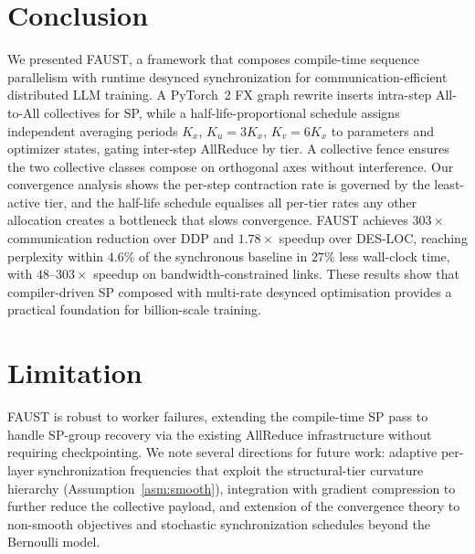 \documentclass{article}
\begin{document}
\section{Conclusion}
\label{sec:conclusion}
We presented FAUST, a framework that composes compile-time sequence parallelism
with runtime desynced synchronization for communication-efficient distributed
LLM training. A PyTorch~2 FX graph rewrite inserts intra-step All-to-All
collectives for SP, while a half-life-proportional schedule assigns independent
averaging periods $K_x$, $K_u{=}3K_x$, $K_v{=}6K_x$ to parameters and optimizer
states, gating inter-step AllReduce by tier. A collective fence ensures the two
collective classes compose on orthogonal axes without interference.
Our convergence analysis shows the per-step contraction rate is governed by the
least-active tier, and the half-life schedule equalises all per-tier rates any
other allocation creates a bottleneck that slows convergence.
FAUST achieves $303{\times}$ communication reduction over DDP and $1.78{\times}$
speedup over DES-LOC, reaching perplexity within $4.6\%$ of the synchronous
baseline in $27\%$ less wall-clock time, with $48$--$303{\times}$ speedup on
bandwidth-constrained links. These results show that compiler-driven SP composed
with multi-rate desynced optimisation provides a practical foundation for
billion-scale training.



\section{Limitation}
\label{sec:limitation}
FAUST is robust to worker failures, extending the compile-time SP pass to handle SP-group recovery via the existing AllReduce infrastructure without requiring checkpointing.
We note several directions for future work: adaptive per-layer synchronization frequencies that exploit the structural-tier curvature hierarchy (Assumption~\ref{asm:smooth}), integration with gradient compression to further reduce the collective payload, and extension of the convergence theory to non-smooth objectives and stochastic synchronization schedules beyond the Bernoulli model.








\appendix



\end{document}
